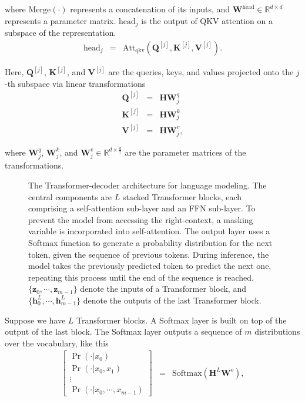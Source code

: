 \noindent where $\mathrm{Merge}(\cdot)$ represents a concatenation of its inputs, and $\mathbf{W}^{\mathrm{head}} \in \mathbb{R}^{d \times d}$ represents a parameter matrix. $\mathrm{head}_j$ is the output of QKV attention on a subspace of the representation.
\begin{eqnarray}
\mathrm{head}_j & = & \mathrm{Att}_{\mathrm{qkv}}(\mathbf{Q}^{[j]},\mathbf{K}^{[j]},\mathbf{V}^{[j]}).
\end{eqnarray}

\noindent Here, $\mathbf{Q}^{[j]}$, $\mathbf{K}^{[j]}$, and $\mathbf{V}^{[j]}$ are the queries, keys, and values projected onto the $j$-th subspace via linear transformations
\begin{eqnarray}
\mathbf{Q}^{[j]} & = & \mathbf{H} \mathbf{W}_j^{q} \\
\mathbf{K}^{[j]} & = & \mathbf{H} \mathbf{W}_j^{k} \\
\mathbf{V}^{[j]} & = & \mathbf{H} \mathbf{W}_j^{v},
\end{eqnarray}

\noindent where $\mathbf{W}_j^{q}$, $\mathbf{W}_j^{k}$, and $\mathbf{W}_j^{v} \in \mathbb{R}^{d \times \frac{d}{\tau}}$ are the parameter matrices of the transformations.

\begin{figure}[!t]
\centering

\caption{The Transformer-decoder architecture for language modeling. The central components are $L$ stacked Transformer blocks, each comprising a self-attention sub-layer and an FFN sub-layer. To prevent the model from accessing the right-context, a masking variable is incorporated into self-attention. The output layer uses a Softmax function to generate a probability distribution for the next token, given the sequence of previous tokens. During inference, the model takes the previously predicted token to predict the next one, repeating this process until the end of the sequence is reached. $\{\mathbf{z}_0,\cdots,\mathbf{z}_{m-1}\}$ denote the inputs of a Transformer block, and $\{\mathbf{h}_0^{L},\cdots,\mathbf{h}_{m-1}^{L}\}$ denote the outputs of the last Transformer block.}
\label{fig:llm-transformer-decoder}
\end{figure}

Suppose we have $L$ Transformer blocks. A Softmax layer is built on top of the output of the last block. The Softmax layer outputs a sequence of $m$ distributions over the vocabulary, like this
\begin{eqnarray}
\begin{bmatrix}
\Pr(\cdot | x_0) \\
\Pr(\cdot | x_0,x_{1}) \\
\vdots \\
\Pr(\cdot | x_0,\cdots,x_{m-1})
\end{bmatrix}
& = & \mathrm{Softmax}(\mathbf{H}^{L} \mathbf{W}^{o}),
\end{eqnarray}

